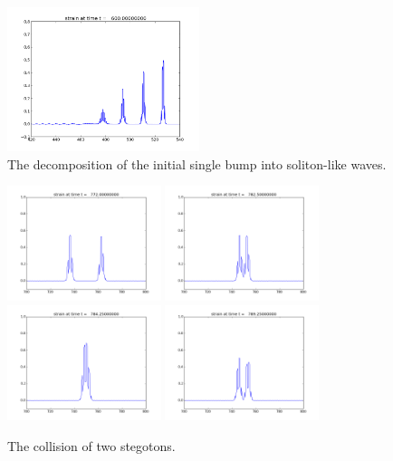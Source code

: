 \documentclass{article}
\begin{document}
\begin{figure}
  \includegraphics[width=0.5\textwidth]{frame0060fig1.png}
  \caption{The decomposition of the initial single bump into soliton-like waves.}
  \label{travelw}
\end{figure}

\begin{figure}
  \includegraphics[width=0.4\textwidth]{stegoton1.png}
  \includegraphics[width=0.4\textwidth]{stegoton2.png}\\
  \includegraphics[width=0.4\textwidth]{stegoton3.png}
  \includegraphics[width=0.4\textwidth]{stegoton4.png}
  \caption{The collision of two stegotons.}
  \label{collision}
\end{figure}
\end{document}
